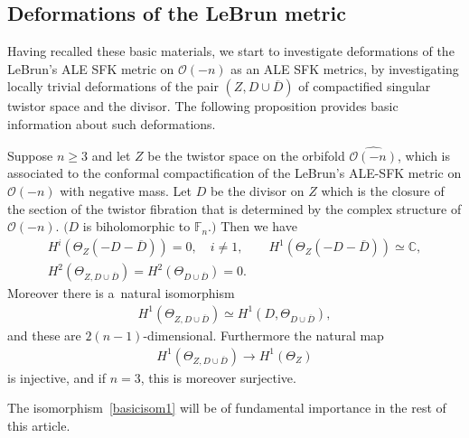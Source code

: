 \subsection{Deformations of the LeBrun metric}
\label{ss:DLm}

Having recalled these basic materials, we start to investigate deformations of the LeBrun's ALE SFK metric on $\mathscr
O(-n)$ as an ALE SFK metrics, by investigating locally trivial deformations of the pair $(Z,D\cup\overline D)$ of
compactif\/ied singular twistor space and the divisor.
The following proposition provides basic information about such deformations.
\begin{Proposition}\label{prop:isom1}
Suppose $n\ge 3$ and let $Z$ be the twistor space on the orbifold $\widehat{\mathscr O(-n)}$, which is associated to the
conformal compactification of the LeBrun's ALE-SFK metric on $\mathscr O(-n)$ with negative mass.
Let $D$ be the divisor on $Z$ which is the closure of the section of the twistor fibration that is determined by the
complex structure of $\mathscr O(-n)$.
$(D$ is biholomorphic to $\mathbb{F}_n.)$ Then we have
\begin{gather}
\label{cohomdim1}
H^i( \Theta_Z(-D-\overline D) ) = 0,
\quad
i\neq 1,
\qquad
H^1( \Theta_Z(-D-\overline D) ) \simeq \mathbb{C},
\\
H^2(\Theta_{Z, D\cup\overline D}) = H^2 ( \Theta_{D\cup \overline D} ) = 0.
\label{van1}
\end{gather}
Moreover there is a~natural isomorphism
\begin{gather}
\label{basicisom1}
H^1 (\Theta_{Z,  D \cup \overline D} ) \simeq H^1 (D, \Theta_{ D \cup \overline D} ),
\end{gather}
and these are $2(n-1)$-dimensional.
Furthermore the natural map
\begin{gather}
\label{forget}
H^1(\Theta_{Z,D\cup\overline D})
\longrightarrow
H^1(\Theta_Z)
\end{gather}
is injective, and if $n=3$, this is moreover surjective.
\end{Proposition}

The isomorphism~\eqref{basicisom1} will be of fundamental importance in the rest of this article.

